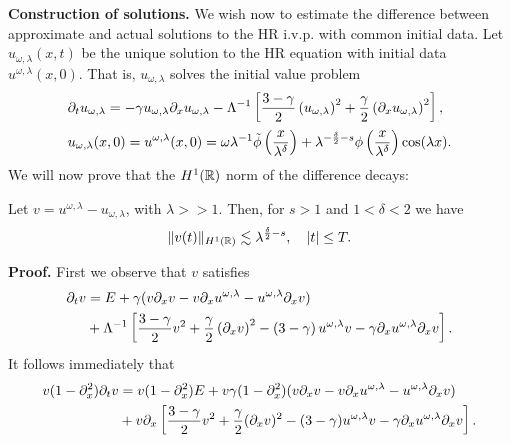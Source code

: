 \textbf{Construction of  solutions.}
We wish now to estimate the difference between approximate and actual 
solutions to
the HR i.v.p. with common initial data. Let
$u_{\omega,\lambda}(x,t)$ be the unique solution to the HR equation
with initial data $u^{\omega,\lambda}(x,0)$. That is,
$u_{\omega,\lambda}$ solves the initial value problem
\begin{align}
& \partial_t u_{\omega,\lambda} = - \gamma u_{\omega,\lambda} \partial_x 
u_{\omega,\lambda} - \Lambda^{-1} \left[
\frac{3- \gamma}{2}\left( u_{\omega,\lambda} \right)^2 + 
\frac{\gamma}{2}\left(
\partial_x u_{\omega,\lambda} \right)^2
\right], \label{apple50}
\\
& u_{\omega,\lambda}(x, 0) = u^{\omega,\lambda}(x,0) = \omega \lambda^{-1}
\tilde{\phi} \left( \frac{x}{\lambda^\delta} \right)
+ \lambda^{-\frac{\delta}{2} -s}
\phi\left( \frac{x}{\lambda^\delta} \right) \cos(\lambda x).
\label{apple41}
\end{align}
%
%
%
We will now prove that the $H^1(\mathbb{R})$ norm of the difference decays: 
%
%
%
%
%
%
%
%
%
%
%
%
%
%
%
\begin{proposition}
\label{applelem:bound_for_difference-of-approx-and-actual-soln}
%
Let $v = u^{\omega,\lambda} - u_{\omega,\lambda}$, with $\lambda >>1$.
Then, for $s > 1$ and $1<\delta<2$ we have
%
%
\begin{equation} \|
v(t)
\|_{H^1(\mathbb{R})}
\lesssim \lambda^{\frac{\delta}{2} -s}, \quad
|t| \le T.
\end{equation}
%
%
\end{proposition}
%
%
\textbf{  Proof.}  First we observe that $v$ satisfies 
%
%
\begin{equation*}
\begin{split}
\partial_t v & = E + \gamma(v \partial_x v - v \partial_x u^{\omega,\lambda} - 
u^{\omega,\lambda} \partial_x v) \\
& + \Lambda^{-1}  \left[ \frac{3-
\gamma}{2}v^2 + \frac{\gamma}{2}\left( \partial_x v \right)^2 - \left(
3 - \gamma \right)u^{\omega,\lambda} v -
\gamma \partial_x u^{\omega,\lambda} \partial_x v \right].
\end{split}
\end{equation*}
It follows immediately that
		\begin{equation}
			\label{applev-dtv-pseudo-functional-equality*}
			\begin{split}
			v(1-\partial_x^2)\partial_t v &= v(1- \partial_x^2)E + v\gamma(1- \partial_x^2)(v\partial_x v 
			- v\partial_x u^{\omega,\lambda} -
			u^{\omega,\lambda} \partial_x v)
			\\
			&+ v\partial_x \left[ \frac{3-\gamma}{2}v^2 + \frac{\gamma}{2}(\partial_x v)^2 -
			(3-\gamma)u^{\omega,\lambda} v - \gamma \partial_x u^{\omega,\lambda} \partial_x v \right].
		\end{split}
	\end{equation}

